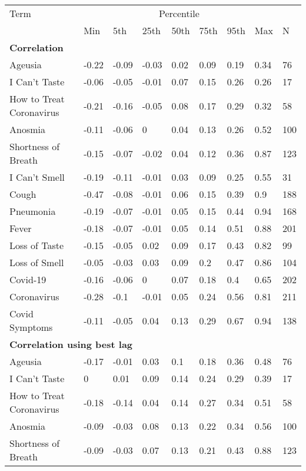 \begin{tabular}{l llllllll} 
\hline 
Term & & \multicolumn{5}{c}{Percentile} &  &  \\ 
 & Min & 5th & 25th & 50th & 75th & 95th & Max & N \\ 
\hline 
\multicolumn{9}{l}{{\bf Correlation}}  \\ 
Ageusia & -0.22 & -0.09 & -0.03 & 0.02 & 0.09 & 0.19 & 0.34 & 76  \\ 
I Can't Taste & -0.06 & -0.05 & -0.01 & 0.07 & 0.15 & 0.26 & 0.26 & 17  \\ 
How to Treat Coronavirus & -0.21 & -0.16 & -0.05 & 0.08 & 0.17 & 0.29 & 0.32 & 58  \\ 
Anosmia & -0.11 & -0.06 & 0 & 0.04 & 0.13 & 0.26 & 0.52 & 100  \\ 
Shortness of Breath & -0.15 & -0.07 & -0.02 & 0.04 & 0.12 & 0.36 & 0.87 & 123  \\ 
I Can't Smell & -0.19 & -0.11 & -0.01 & 0.03 & 0.09 & 0.25 & 0.55 & 31  \\ 
Cough & -0.47 & -0.08 & -0.01 & 0.06 & 0.15 & 0.39 & 0.9 & 188  \\ 
Pneumonia & -0.19 & -0.07 & -0.01 & 0.05 & 0.15 & 0.44 & 0.94 & 168  \\ 
Fever & -0.18 & -0.07 & -0.01 & 0.05 & 0.14 & 0.51 & 0.88 & 201  \\ 
Loss of Taste & -0.15 & -0.05 & 0.02 & 0.09 & 0.17 & 0.43 & 0.82 & 99  \\ 
Loss of Smell & -0.05 & -0.03 & 0.03 & 0.09 & 0.2 & 0.47 & 0.86 & 104  \\ 
Covid-19 & -0.16 & -0.06 & 0 & 0.07 & 0.18 & 0.4 & 0.65 & 202  \\ 
Coronavirus & -0.28 & -0.1 & -0.01 & 0.05 & 0.24 & 0.56 & 0.81 & 211  \\ 
Covid Symptoms & -0.11 & -0.05 & 0.04 & 0.13 & 0.29 & 0.67 & 0.94 & 138  \\ 
\hline 
\multicolumn{9}{l}{{\bf Correlation using best lag}}  \\ 
Ageusia & -0.17 & -0.01 & 0.03 & 0.1 & 0.18 & 0.36 & 0.48 & 76  \\ 
I Can't Taste & 0 & 0.01 & 0.09 & 0.14 & 0.24 & 0.29 & 0.39 & 17  \\ 
How to Treat Coronavirus & -0.18 & -0.14 & 0.04 & 0.14 & 0.27 & 0.34 & 0.51 & 58  \\ 
Anosmia & -0.09 & -0.03 & 0.08 & 0.13 & 0.22 & 0.34 & 0.56 & 100  \\ 
Shortness of Breath & -0.09 & -0.03 & 0.07 & 0.13 & 0.21 & 0.43 & 0.88 & 123  \\ 

\end{tabular}
